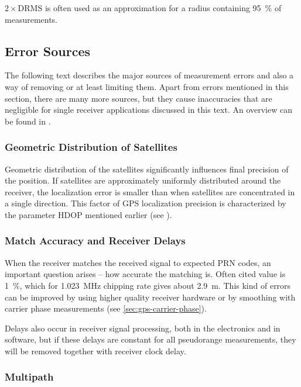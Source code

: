 \(2 \times \mathrm{DRMS}\) is often used as an approximation for a radius containing
\SI{95}{\percent} of measurements.

\subsection{Error Sources}
\label{sec:gps-error-sources}

The following text describes the major sources of measurement errors and also a way
of removing or at least limiting them.
Apart from errors mentioned in this section, there are many more sources, but they cause inaccuracies
that are negligible for single receiver applications discussed in this text.
An overview can be found in \cite{kouba09}.

\subsubsection{Geometric Distribution of Satellites}
Geometric distribution of the satellites significantly influences final
precision of the position.
If satellites are approximately uniformly distributed around the receiver,
the localization error is smaller than when satellites are concentrated
in a single direction.
This factor of GPS localization precision is characterized by the parameter HDOP
mentioned earlier (see ).

\subsubsection{Match Accuracy and Receiver Delays}

When the receiver matches the received signal to expected PRN codes, an
important question arises -- how accurate the matching is.
Often cited value is \SI{1}{\percent}, which for \SI{1.023}{\mega\hertz}
chipping rate gives about \SI{2.9}{\meter}.
This kind of errors can be improved by using higher quality receiver hardware
or by smoothing with carrier phase measurements (see \cref{sec:gps-carrier-phase}).

Delays also occur in receiver signal processing, both in the electronics and in software,
but if these delays are constant for all pseudorange measurements, they will be removed
together with receiver clock delay.

\subsubsection{Multipath}

